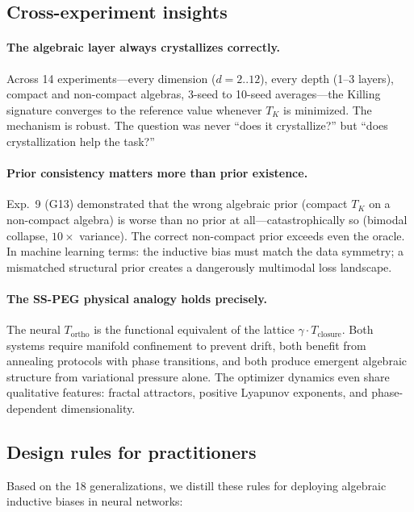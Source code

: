 \documentclass[11pt,a4paper]{article}
\newcommand{\TK}{T_K}
\newcommand{\Tortho}{T_{\mathrm{ortho}}}
\newcommand{\Tclosure}{T_{\mathrm{closure}}}
\theoremstyle{definition}
\begin{document}
\subsection{Cross-experiment insights}
\label{sec:cross_insights}

\paragraph{The algebraic layer always crystallizes correctly.}
Across 14 experiments---every dimension ($d = 2..12$), every depth 
(1--3 layers), compact and non-compact algebras, 3-seed to 10-seed 
averages---the Killing signature converges to the reference value 
whenever $\TK$ is minimized. The mechanism is robust. The question 
was never ``does it crystallize?'' but ``does crystallization help 
the task?''

\paragraph{Prior consistency matters more than prior existence.}
Exp.~9 (G13) demonstrated that the wrong algebraic prior (compact 
$\TK$ on a non-compact algebra) is worse than no prior at all---catastrophically 
so (bimodal collapse, $10\times$ variance). The correct non-compact 
prior exceeds even the oracle. In machine learning terms: the inductive 
bias must match the data symmetry; a mismatched structural prior creates 
a dangerously multimodal loss landscape.

\paragraph{The SS-PEG physical analogy holds precisely.}
The neural $\Tortho$ is the functional equivalent of the lattice 
$\gamma \cdot \Tclosure$. Both systems require manifold confinement to 
prevent drift, both benefit from annealing protocols with phase 
transitions, and both produce emergent algebraic structure from 
variational pressure alone. The optimizer dynamics even share 
qualitative features: fractal attractors, positive Lyapunov exponents, 
and phase-dependent dimensionality.


\subsection{Design rules for practitioners}
\label{sec:design_rules}

Based on the 18 generalizations, we distill these rules for deploying 
algebraic inductive biases in neural networks:
\end{document}
